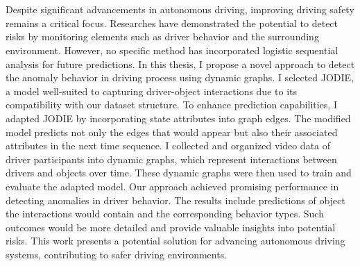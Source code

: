 \chapter{\abstractname}

Despite significant advancements in autonomous driving, improving driving safety remains a critical focus. Researches have demonstrated the potential to detect risks by monitoring elements such as driver behavior and the surrounding environment. However, no specific method has incorporated logistic sequential analysis for future predictions. In this thesis, I propose a novel approach to detect the anomaly behavior in driving process using dynamic graphs. I selected JODIE, a model well-suited to capturing driver-object interactions due to its compatibility with our dataset structure. To enhance prediction capabilities, I adapted JODIE by incorporating state attributes into graph edges. The modified model predicts not only the edges that would appear but also their associated attributes in the next time sequence. I collected and organized video data of driver participants into dynamic graphs, which represent interactions between drivers and objects over time. These dynamic graphs were then used to train and evaluate the adapted model. Our approach achieved promising performance in detecting anomalies in driver behavior. The results include predictions of object the interactions would contain and the corresponding behavior types. Such outcomes would be more detailed and provide valuable insights into potential risks. This work presents a potential solution for advancing autonomous driving systems, contributing to safer driving environments.



\makeatletter
{}
{\renewcommand{\abstractname}{Kurzfassung}}
{\renewcommand{\abstractname}{Abstract}}
\makeatother

\chapter{\abstractname}

